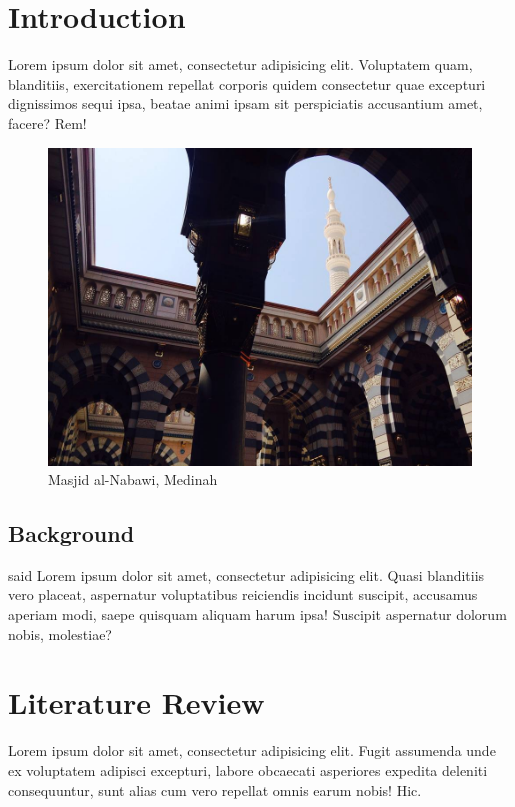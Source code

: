 \chapter{Introduction}\label{introduction}

Lorem ipsum \autocite{partridge2011forty} dolor sit amet, consectetur
adipisicing elit. Voluptatem quam, blanditiis, exercitationem repellat
corporis quidem consectetur quae excepturi dignissimos sequi ipsa,
beatae animi ipsam sit perspiciatis accusantium amet, facere? Rem!

\begin{figure}
\centering
\includegraphics[width=1.00000\textwidth]{figure.jpg}
\caption{Masjid al-Nabawi, Medinah}
\end{figure}

\section{Background}\label{background}

\textcite{7282364} said Lorem ipsum dolor sit amet, consectetur
adipisicing elit. Quasi blanditiis vero placeat, aspernatur voluptatibus
reiciendis incidunt suscipit, accusamus aperiam modi, saepe quisquam
aliquam harum ipsa! Suscipit aspernatur dolorum nobis, molestiae?

\chapter{Literature Review}\label{literature-review}

Lorem ipsum dolor sit amet, consectetur adipisicing elit. Fugit
assumenda unde ex voluptatem adipisci excepturi, labore obcaecati
asperiores expedita deleniti consequuntur, sunt alias cum vero repellat
omnis earum nobis! Hic.

